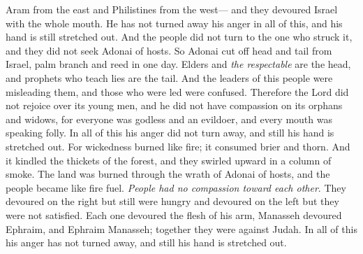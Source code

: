 \begin{biblechapter}
\verse Aram from the east 
and Philistines from the west— 
and they devoured Israel with the whole mouth. 
He has not turned away his anger in all of this, 
and his hand is still stretched out.
\verse And the people did not turn to the one who struck it, 
and they did not seek Adonai of hosts.
\verse So Adonai cut off head and tail from Israel, 
palm branch and reed in one day.
\verse Elders and \textit{the respectable} are the head, 
and prophets who teach lies are the tail.
\verse And the leaders of this people were misleading them, 
and those who were led were confused.
\verse Therefore the Lord did not rejoice over its young men, 
and he did not have compassion on its orphans and widows, 
for everyone was godless and an evildoer, 
and every mouth was speaking folly. 
In all of this his anger did not turn away, 
and still his hand is stretched out.
\verse For wickedness burned like fire; 
it consumed brier and thorn. 
And it kindled the thickets of the forest, 
and they swirled upward in a column of smoke.
\verse The land was burned through the wrath of Adonai of hosts, 
and the people became like fire fuel. 
\textit{People had no compassion toward each other}.
\verse They devoured on the right but still were hungry 
and devoured on the left but they were not satisfied. 
Each one devoured the flesh of his arm,
\verse Manasseh devoured Ephraim, and Ephraim Manasseh; 
together they were against Judah. 
In all of this his anger has not turned away, 
and still his hand is stretched out.
\end{biblechapter}

